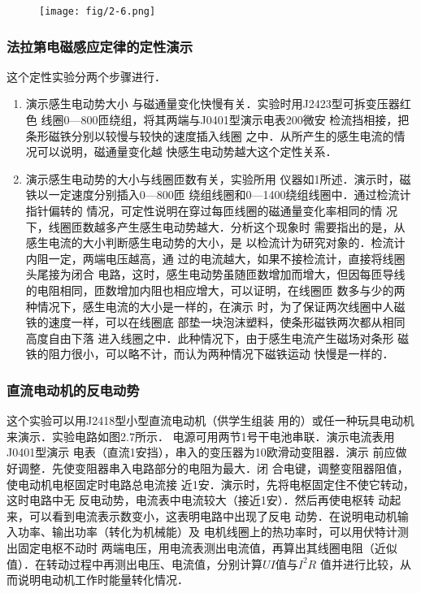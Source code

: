 \begin{figure}[htp]
    \centering
\texttt{[image: fig/2-6.png]}
    \caption{}
\end{figure}

\subsubsection{法拉第电磁感应定律的定性演示}
这个定性实验分两个步骤进行．
\begin{enumerate}
\item 演示感生电动势大小
与磁通量变化快慢有关．实验时用J2423型可拆变压器红色
线圈0—800匝绕组，将其两端与J0401型演示电表200微安
检流挡相接，把条形磁铁分别以较慢与较快的速度插入线圈
之中．从所产生的感生电流的情况可以说明，磁通量变化越
快感生电动势越大这个定性关系．
\item 演示感生电动势的大小与线圈匝数有关，实验所用
仪器如1所述．演示时，磁铁以一定速度分别插入0—800匝
绕组线圈和0—1400绕组线圈中．通过检流计指针偏转的
情况，可定性说明在穿过每匝线圈的磁通量变化率相同的情
况下，线圈匝数越多产生感生电动势越大．分析这个现象时
需要指出的是，从感生电流的大小判断感生电动势的大小，是
以检流计为研究对象的．检流计内阻一定，两端电压越高，通
过的电流越大，如果不接检流计，直接将线圈头尾接为闭合
电路，这时，感生电动势虽随匝数增加而增大，但因每匝导线
的电阻相同，匝数增加内阻也相应增大，可以证明，在线圈匝
数多与少的两种情况下，感生电流的大小是一样的，在演示
时，为了保证两次线圈中人磁铁的速度一样，可以在线圈底
部垫一块泡沫塑料，使条形磁铁两次都从相同高度自由下落
进入线圈之中．此种情况下，由于感生电流产生磁场对条形
磁铁的阻力很小，可以略不计，而认为两种情况下磁铁运动
快慢是一样的．
\end{enumerate}

\subsubsection{直流电动机的反电动势}
这个实验可以用J2418型小型直流电动机（供学生组装
用的）或任一种玩具电动机来演示．实验电路如图2.7所示．
电源可用两节1号干电池串联．演示电流表用J0401型演示
电表（直流1安挡），串入的变压器为10欧滑动变阻器．演示
前应做好调整．先使变阻器串入电路部分的电阻为最大．闭
合电键，调整变阻器阻值，使电动机电枢固定时电路总电流接
近1安．演示时，先将电枢固定住不使它转动，这时电路中无
反电动势，电流表中电流较大（接近1安）．然后再使电枢转
动起来，可以看到电流表示数变小，这表明电路中出现了反电
动势．在说明电动机输入功率、输出功率（转化为机械能）及
电机线圈上的热功率时，可以用伏特计测出固定电枢不动时
两端电压，用电流表测出电流值，再算出其线圈电阻（近似
值）．在转动过程中再测出电压、电流值，分别计算$UI$值与$I^2R$
值并进行比较，从而说明电动机工作时能量转化情况．

